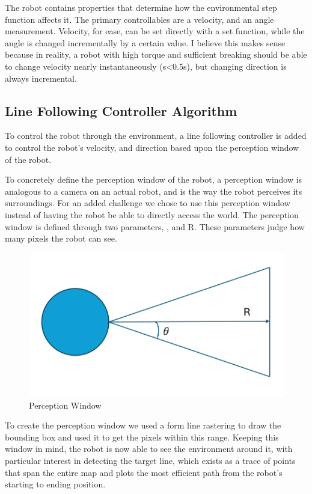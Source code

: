\documentclass[11pt]{article}
\begin{document}
    The robot contains properties that determine how the environmental step function affects it. The primary controllables are a velocity, and an angle measurement. Velocity, for ease, can be set directly with a set function, while the angle is changed incrementally by a certain value. I believe this makes sense because in reality, a robot with high torque and sufficient breaking should be able to change velocity nearly instantaneously (s<0.5s), but changing direction is always incremental. 

    \subsection{Line Following Controller Algorithm}
    To control the robot through the environment, a line following controller is added to control the robot's velocity, and direction based upon the perception window of the robot. 

    To concretely define the perception window of the robot, a perception window
    is analogous to a camera on an actual robot, and is the way the robot
    perceives its surroundings. For an added challenge we chose to use this
    perception window instead of having the robot be able to directly access the
    world. The perception window is defined through two parameters, , and R.
    These parameters judge how many pixels the robot can see. 

    \begin{figure}[ht]
        \centering
        \includegraphics[scale=0.2]{figures/perception_window.png}
        \caption{Perception Window}
        \label{fig:Perception_window}
    \end{figure}
    
    To create the perception window we used a form line rastering to draw the bounding box and used it to get the pixels within this range. Keeping this window in mind, the robot is now able to see the environment around it, with particular interest in detecting the target line, which exists as a trace of points that span the entire map and plots the most efficient path from the robot's starting to ending position.
\end{document}
